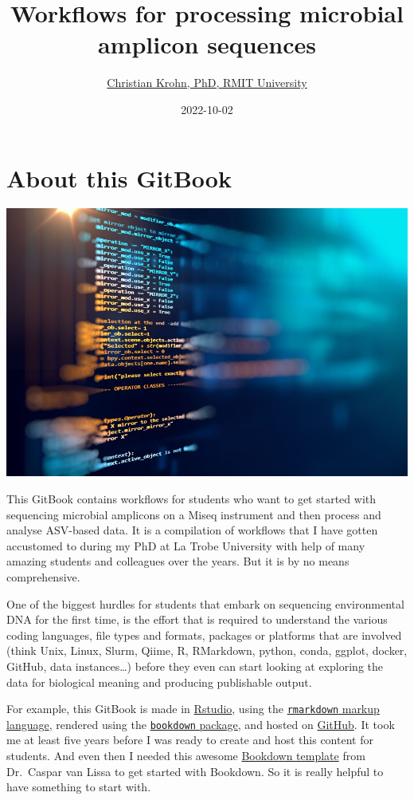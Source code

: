 \documentclass[
]{book}
\title{Workflows for processing microbial amplicon sequences}
\author{\href{https://www.rmit.edu.au/contact/staff-contacts/academic-staff/k/krohn---christian}{Christian Krohn, PhD, RMIT University}}
\date{2022-10-02}
\begin{document}
\maketitle

{
\setcounter{tocdepth}{1}
\tableofcontents
}
\hypertarget{about}{%
\chapter{About this GitBook}\label{about}}

\includegraphics{./img/data.jpeg}

This GitBook contains workflows for students who want to get started with sequencing microbial amplicons on a Miseq instrument and then process and analyse ASV-based data. It is a compilation of workflows that I have gotten accustomed to during my PhD at La Trobe University with help of many amazing students and colleagues over the years. But it is by no means comprehensive.

One of the biggest hurdles for students that embark on sequencing environmental DNA for the first time, is the effort that is required to understand the various coding languages, file types and formats, packages or platforms that are involved (think Unix, Linux, Slurm, Qiime, R, RMarkdown, python, conda, ggplot, docker, GitHub, data instances\ldots) before they even can start looking at exploring the data for biological meaning and producing publishable output.

For example, this GitBook is made in \href{https://rstudio.com}{Rstudio}, using the \href{https://rstudio.com/wp-content/uploads/2016/03/rmarkdown-cheatsheet-2.0.pdf}{\texttt{rmarkdown} markup language}, rendered using the \href{https://bookdown.org/yihui/bookdown/get-started.html}{\texttt{bookdown} package}, and hosted on \href{https://github.com/}{GitHub}. It took me at least five years before I was ready to create and host this content for students. And even then I needed this awesome \href{https://cjvanlissa.github.io/gitbook-demo/index.html}{Bookdown template} from Dr.~Caspar van Lissa to get started with Bookdown. So it is really helpful to have something to start with.
\end{document}
